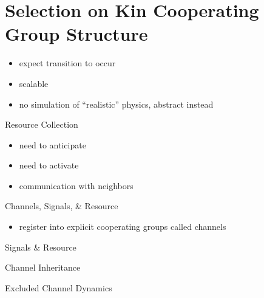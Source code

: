 \section{Selection on Kin Cooperating Group Structure}

\begin{frame}
\begin{itemize}
\item expect transition to occur
\item scalable
\item no simulation of ``realistic'' physics, abstract instead
\end{itemize}
\end{frame}

\begin{frame}{Resource Collection}
\begin{itemize}
\item need to anticipate
\item need to activate
\item communication with neighbors
\end{itemize}
\end{frame}

\begin{frame}{Channels, Signals, \& Resource}
\begin{itemize}
\item register into explicit cooperating groups called channels
\end{itemize}
\end{frame}


\begin{frame}{Signals \& Resource}
  \vspace{4ex}
  
\end{frame}

\begin{frame}{Channel Inheritance}
  \vspace{8ex}
  
\end{frame}

\begin{frame}{Excluded Channel Dynamics}
  \vspace{6.6ex}
  
\end{frame}


